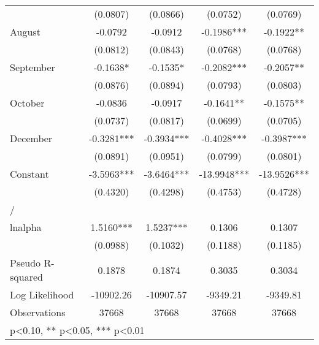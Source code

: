 \begin{table}[htbp]
\begin{tabular}{l*{4}{c}}
                    &    (0.0807)   &    (0.0866)   &    (0.0752)   &    (0.0769)   \\
August              &     -0.0792   &     -0.0912   &     -0.1986***&     -0.1922** \\
                    &    (0.0812)   &    (0.0843)   &    (0.0768)   &    (0.0768)   \\
September           &     -0.1638*  &     -0.1535*  &     -0.2082***&     -0.2057** \\
                    &    (0.0876)   &    (0.0894)   &    (0.0793)   &    (0.0803)   \\
October             &     -0.0836   &     -0.0917   &     -0.1641** &     -0.1575** \\
                    &    (0.0737)   &    (0.0817)   &    (0.0699)   &    (0.0705)   \\
December            &     -0.3281***&     -0.3934***&     -0.4028***&     -0.3987***\\
                    &    (0.0891)   &    (0.0951)   &    (0.0799)   &    (0.0801)   \\
Constant            &     -3.5963***&     -3.6464***&    -13.9948***&    -13.9526***\\
                    &    (0.4320)   &    (0.4298)   &    (0.4753)   &    (0.4728)   \\
\hline
/                   &               &               &               &               \\
lnalpha             &      1.5160***&      1.5237***&      0.1306   &      0.1307   \\
                    &    (0.0988)   &    (0.1032)   &    (0.1188)   &    (0.1185)   \\
\hline
Pseudo R-squared    &      0.1878   &      0.1874   &      0.3035   &      0.3034   \\
Log Likelihood      &   -10902.26   &   -10907.57   &    -9349.21   &    -9349.81   \\
Observations        &       37668   &       37668   &       37668   &       37668   \\
\hline\hline
\multicolumn{5}{l}{\footnotesize * p<0.10, ** p<0.05, *** p<0.01}\\
\end{tabular}
\end{table}
